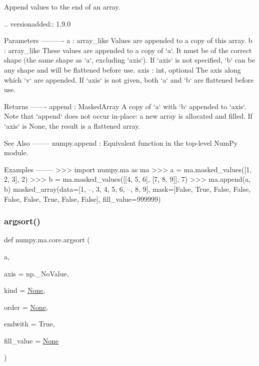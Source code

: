 \begin{DoxyVerb}Append values to the end of an array.

.. versionadded:: 1.9.0

Parameters
----------
a : array_like
    Values are appended to a copy of this array.
b : array_like
    These values are appended to a copy of `a`.  It must be of the
    correct shape (the same shape as `a`, excluding `axis`).  If `axis`
    is not specified, `b` can be any shape and will be flattened
    before use.
axis : int, optional
    The axis along which `v` are appended.  If `axis` is not given,
    both `a` and `b` are flattened before use.

Returns
-------
append : MaskedArray
    A copy of `a` with `b` appended to `axis`.  Note that `append`
    does not occur in-place: a new array is allocated and filled.  If
    `axis` is None, the result is a flattened array.

See Also
--------
numpy.append : Equivalent function in the top-level NumPy module.

Examples
--------
>>> import numpy.ma as ma
>>> a = ma.masked_values([1, 2, 3], 2)
>>> b = ma.masked_values([[4, 5, 6], [7, 8, 9]], 7)
>>> ma.append(a, b)
masked_array(data=[1, --, 3, 4, 5, 6, --, 8, 9],
             mask=[False,  True, False, False, False, False,  True, False,
                   False],
       fill_value=999999)
\end{DoxyVerb}
 \mbox{\label{namespacenumpy_1_1ma_1_1core_a7182a766d8dca191a3c36bb6335a2209}} 
\subsubsection{\texorpdfstring{argsort()}{argsort()}}
{\footnotesize\ttfamily def numpy.\+ma.\+core.\+argsort (\begin{DoxyParamCaption}\item[{}]{a,  }\item[{}]{axis = {\ttfamily np.\+\_\+NoValue},  }\item[{}]{kind = {\ttfamily \hyperlink{namespacenumpy_1_1ma_1_1core_a647ee1848dfa3692fe35a663a2aa40b3}{None}},  }\item[{}]{order = {\ttfamily \hyperlink{namespacenumpy_1_1ma_1_1core_a647ee1848dfa3692fe35a663a2aa40b3}{None}},  }\item[{}]{endwith = {\ttfamily True},  }\item[{}]{fill\+\_\+value = {\ttfamily \hyperlink{namespacenumpy_1_1ma_1_1core_a647ee1848dfa3692fe35a663a2aa40b3}{None}} }\end{DoxyParamCaption})}

